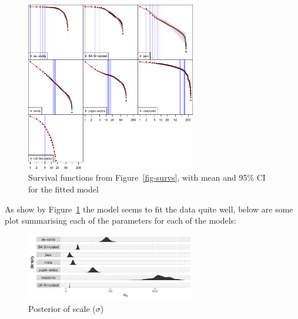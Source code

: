 \documentclass[
  10pt,
  a4paper,
]{scrreprt}
\theoremstyle{plain}
\theoremstyle{definition}
\theoremstyle{plain}
\theoremstyle{remark}
\begin{document}
{\begin{figure}[H]
{\centering \includegraphics[width=0.66\textwidth,height=\textheight]{doc_files/figure-pdf/fig-fits1-1.pdf}

}

\caption{\label{fig-fits1}Survival functions from
Figure~\ref{fig-survs}, with mean and 95\% CI for the fitted model}

\end{figure}

As show by Figure~\ref{fig-fits1} the model seems to fit the data quite
well, below are some plot summarising each of the parameters for each of
the models:

\begin{figure}[H]

{\centering \includegraphics[width=0.66\textwidth,height=\textheight]{doc_files/figure-pdf/fig-scale-1.pdf}

}

\caption{\label{fig-scale}Posterior of scale (\(\sigma\))}

\end{figure}

\begin{figure}

\begin{minipage}[t]{0.50\linewidth}

{\centering 

}
\end{minipage}
\end{figure}}
\end{document}
